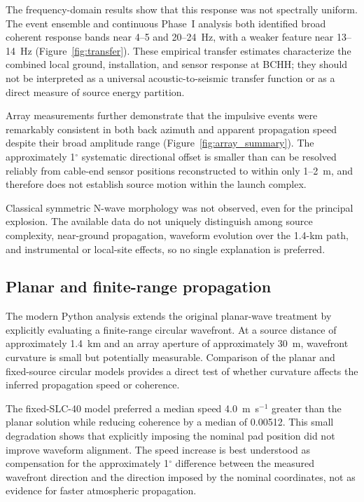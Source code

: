 \documentclass[]{seismica}
\begin{document}
The frequency-domain results show that this response was not spectrally
uniform. The event ensemble and continuous Phase~I analysis both identified
broad coherent response bands near 4--5 and 20--24~Hz, with a weaker feature
near 13--14~Hz (Figure~\ref{fig:transfer}). These empirical transfer estimates
characterize the combined local ground, installation, and sensor response at
BCHH; they should not be interpreted as a universal acoustic-to-seismic
transfer function or as a direct measure of source energy partition.

Array measurements further demonstrate that the impulsive events were
remarkably consistent in both back azimuth and apparent propagation speed
despite their broad amplitude range (Figure~\ref{fig:array_summary}). The
approximately 1$^\circ$ systematic directional offset is smaller than can be
resolved reliably from cable-end sensor positions reconstructed to within only
1--2~m, and therefore does not establish source motion within the launch
complex.

Classical symmetric N-wave morphology was not observed, even for the
principal explosion. The available data do not uniquely distinguish among
source complexity, near-ground propagation, waveform evolution over the
1.4-km path, and instrumental or local-site effects, so no single explanation
is preferred.

\subsection{Planar and finite-range propagation}
\label{sec:discussion_propagation}

The modern Python analysis extends the original planar-wave treatment by explicitly evaluating a finite-range circular wavefront. At a source distance of approximately 1.4~km and an array aperture of approximately 30~m, wavefront curvature is small but potentially measurable. Comparison of the planar and fixed-source circular models provides a direct test of whether curvature affects the inferred propagation speed or coherence.

The fixed-SLC-40 model preferred a median speed 4.0~m~s$^{-1}$ greater than the
planar solution while reducing coherence by a median of 0.00512. This small
degradation shows that explicitly imposing the nominal pad position did not
improve waveform alignment. The speed increase is best understood as
compensation for the approximately 1$^\circ$ difference between the measured
wavefront direction and the direction imposed by the nominal coordinates, not
as evidence for faster atmospheric propagation.
\end{document}
